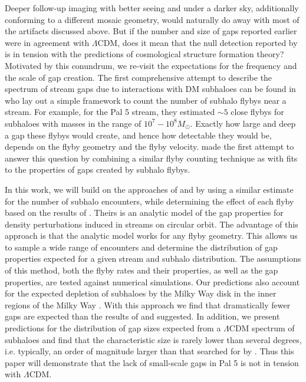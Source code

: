 \documentclass[useAMS,usenatbib]{mn2e}
\begin{document}
Deeper follow-up imaging with better seeing and under a darker sky,
additionally conforming to a different mosaic geometry, would naturally
do away with most of the artifacts discussed above. But if the number
and size of gaps reported earlier were in agreement with $\Lambda$CDM,
does it mean that the null detection reported by
\citet{ibata_et_al_pal5} is in tension with the predictions of
cosmological structure formation theory? Motivated by this conundrum,
we re-visit the expectations for the frequency and the scale of gap
creation. The first comprehensive attempt to describe the spectrum of
stream gaps due to interactions with DM subhaloes can be found in
\cite{yoon_etal_2011} who lay out a simple framework to count the
number of subhalo flybys near a stream. For example, for the Pal 5
stream, they estimated $\sim 5$ close flybys for subhaloes with masses
in the range of $10^7-10^8 M_\odot$. Exactly how large and deep a gap
these flybys would create, and hence how detectable they would be,
depends on the flyby geometry and the flyby
velocity. \cite{carlberg_2012} made the first attempt to answer this
question by combining a similar flyby counting technique as
\cite{yoon_etal_2011} with fits to the properties of gaps created by
subhalo flybys.

In this work, we will build on the approaches of \cite{yoon_etal_2011}
and \cite{carlberg_2012} by using a similar estimate for the number of
subhalo encounters, while determining the effect of each flyby based
on the results of \cite{three_phases}. Theirs is an analytic model of
the gap properties for density perturbations induced in streams on
circular orbit. The advantage of this approach is that the analytic
model works for any flyby geometry. This allows us to sample a wide
range of encounters and determine the distribution of gap properties
expected for a given stream and subhalo distribution. The assumptions
of this method, both the flyby rates and their properties, as well as
the gap properties, are tested against numerical simulations. Our
predictions also account for the expected depletion of subhaloes by
the Milky Way disk in the inner regions of the Milky Way
\citep{donghia_et_al_2010}. With this approach we find that
dramatically fewer gaps are expected than the results of
\cite{yoon_etal_2011} and \cite{carlberg_2012} suggested. In addition,
we present predictions for the distribution of gap sizes expected from
a $\Lambda$CDM spectrum of subhaloes and find that the characteristic
size is rarely lower than several degrees, i.e. typically, an order of
magnitude larger than that searched for by
\citet{ibata_et_al_pal5}. Thus this paper will demonstrate that the
lack of small-scale gaps in Pal 5 is not in tension with $\Lambda$CDM.
\end{document}
